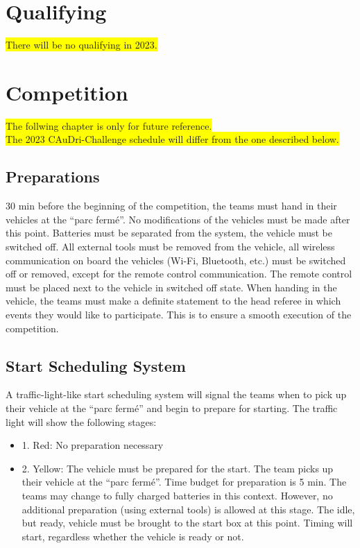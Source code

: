 \documentclass[a4paper]{report}
\begin{document}
{{\section{Qualifying}

\colorbox{yellow}{There will be no qualifying in 2023.} 

\section{Competition} 

\colorbox{yellow}{The follwing chapter is only for future reference.}\\ 
\colorbox{yellow}{The 2023 CAuDri-Challenge schedule will differ from the one described below.}

\subsection{Preparations} 

30 min before the beginning of the competition, the teams must hand in their vehicles at the “parc fermé”. No modifications of the vehicles must be made after this point. Batteries must be separated from the system, the vehicle must be switched off. All external tools must be removed from the vehicle, all wireless communication on board the vehicles (Wi-Fi, Bluetooth, etc.) must be switched off or removed, except for the remote control communication. The remote control must be placed next to the vehicle in switched off state. When handing in the vehicle, the teams must make a definite statement to the head referee in which events they would like to participate. This is to ensure a smooth execution of the competition. 

\subsection{Start Scheduling System}
\label{start_scheduling}

A traffic-light-like start scheduling system will signal the teams when to pick up their vehicle at the “parc fermé” and begin to prepare for starting. The traffic light will show the following stages: 

\begin{itemize}
\item 1. Red: No preparation necessary 

\item 2. Yellow: The vehicle must be prepared for the start. The team picks up their vehicle at the “parc fermé”. Time budget for preparation is 5 min. The teams may change to fully charged batteries in this context. However, no additional preparation (using external tools) is allowed at this stage. The idle, but ready, vehicle must be brought to the start box at this point. Timing will start, regardless whether the vehicle is ready or not. 


\end{itemize}}}
\end{document}
